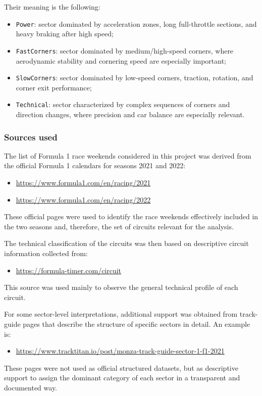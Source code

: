 \documentclass[12pt,a4paper]{article}
\begin{document}
	Their meaning is the following:
	\begin{itemize}
		\item \texttt{Power}: sector dominated by acceleration zones, long full-throttle sections, and heavy braking after high speed;
		
		\item \texttt{FastCorners}: sector dominated by medium/high-speed corners, where aerodynamic stability and cornering speed are especially important;
		
		\item \texttt{SlowCorners}: sector dominated by low-speed corners, traction, rotation, and corner exit performance;
		
		\item \texttt{Technical}: sector characterized by complex sequences of corners and direction changes, where precision and car balance are especially relevant.
		
	\end{itemize}
	
	

	
	\subsubsection*{Sources used }
	
	The list of Formula 1 race weekends considered in this project was derived from the official Formula 1 calendars for seasons 2021 and 2022:
	
	\begin{itemize}
		\item \url{https://www.formula1.com/en/racing/2021}
		\item \url{https://www.formula1.com/en/racing/2022}
	\end{itemize}
	
	These official pages were used to identify the race weekends effectively included in the two seasons and, therefore, the set of circuits relevant for the analysis. 
	
	The technical classification of the circuits was then based on descriptive circuit information collected from:
	
	\begin{itemize}
		\item \url{https://formula-timer.com/circuit}
	\end{itemize}
	
	This source was used mainly to observe the general technical profile of each circuit.
	
	For some sector-level interpretations, additional support was obtained from track-guide pages that describe the structure of specific sectors in detail. An example is:
	
	\begin{itemize}
		\item \url{https://www.tracktitan.io/post/monza-track-guide-sector-1-f1-2021}
	\end{itemize}
	
	These pages were not used as official structured datasets, but as descriptive support to assign the dominant category of each sector in a transparent and documented way. 


	
\end{document}
